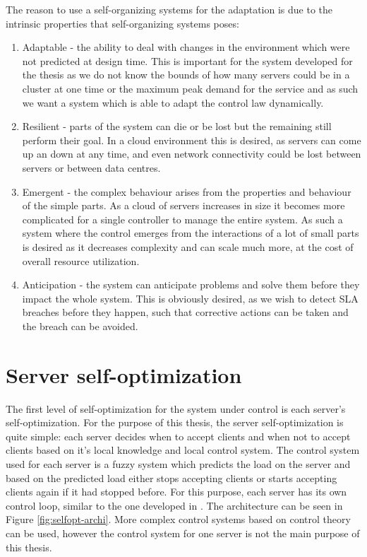 The reason to use a self-organizing systems for the adaptation is due to the intrinsic properties that self-organizing systems poses:
\begin{enumerate}
	\item Adaptable - the ability to deal with changes in the environment which were not predicted at design time. This is important for the system developed for the thesis as we do not know the bounds of how many servers could be in a cluster at one time or the maximum peak demand for the service and as such we want a system which is able to adapt the control law dynamically.
	\item Resilient - parts of the system can die or be lost but the remaining still perform their goal. In a cloud environment this is desired, as servers can come up an down at any time, and even network connectivity could be lost between servers or between data centres.
	\item Emergent - the complex behaviour arises from the properties and behaviour of the simple parts. As a cloud of servers increases in size it becomes more complicated for a single controller to manage the entire system. As such a system where the control emerges from the interactions of a lot of small parts is desired as it decreases complexity and can scale much more, at the cost of overall resource utilization.
	\item Anticipation - the system can anticipate problems and solve them before they impact the whole system. This is obviously desired, as we wish to detect SLA breaches before they happen, such that corrective actions can be taken and the breach can be avoided.
\end{enumerate}

\section{Server self-optimization}

The first level of self-optimization for the system under control is each server's self-optimization. For the purpose of this thesis, the server self-optimization is quite simple: each server decides when to accept clients and when not to accept clients based on it's local knowledge and local control system. The control system used for each server is a fuzzy system which predicts the load on the server and based on the predicted load either stops accepting clients or starts accepting clients again if it had stopped before. For this purpose, each server has its own control loop, similar to the one developed in \cite{bogdan:seams07}. The architecture can be seen in Figure \ref{fig:selfopt-archi}. More complex control systems based on control theory can be used, however the control system for one server is not the main purpose of this thesis.

